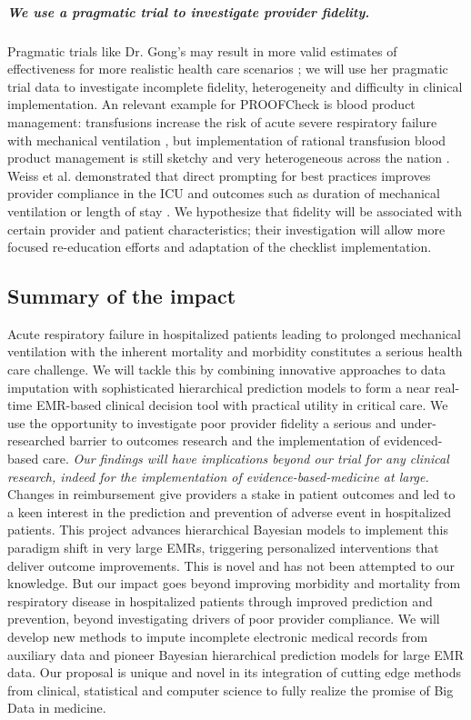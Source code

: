 \documentclass[11pt,notitlepage]{article}
\begin{document}
\subparagraph*{We use a pragmatic trial to investigate provider fidelity.} Pragmatic trials like Dr. Gong's may result in more valid estimates of effectiveness for more realistic health care scenarios \cite{Selby_22824225,Tosh_21842618}; we will use her pragmatic trial data to investigate incomplete fidelity, heterogeneity and difficulty in clinical implementation. An relevant example for PROOFCheck is blood product management: transfusions increase the risk of acute severe respiratory failure with mechanical ventilation \cite{Kenz_24892308}, but implementation of rational transfusion blood product management is still sketchy and very heterogeneous across the nation \cite{Likosky_20488928}. Weiss et al. demonstrated that direct prompting for best practices improves provider compliance in the ICU and outcomes such as duration of mechanical ventilation or length of stay \cite{Weiss_21616996}. We hypothesize that fidelity will be associated with certain provider and patient characteristics; their investigation will allow more focused re-education efforts and adaptation of the checklist implementation. 

\subsection*{Summary of the impact}
Acute respiratory failure in hospitalized patients leading to prolonged mechanical ventilation with the inherent mortality and morbidity constitutes a serious health care challenge. We will tackle this by combining innovative approaches to data imputation with sophisticated hierarchical prediction models to form a near real-time EMR-based clinical decision tool with practical utility in critical care. We use the opportunity to investigate poor provider fidelity a serious and under-researched barrier to outcomes research and the implementation of evidenced-based care. \textit{Our findings will have implications beyond our trial for any clinical research, indeed for the implementation of evidence-based-medicine at large.} Changes in reimbursement give providers a stake in patient outcomes and led to a keen interest in the prediction and prevention of adverse event in hospitalized patients. This project advances hierarchical Bayesian models to implement this paradigm shift in very large EMRs, triggering personalized interventions that deliver outcome improvements. This is novel and has not been attempted to our knowledge. But our impact goes beyond improving morbidity and mortality from respiratory disease in hospitalized patients through improved prediction and prevention, beyond investigating drivers of poor provider compliance. We will develop new methods to impute incomplete electronic medical records from auxiliary data and pioneer Bayesian hierarchical prediction models for large EMR data. Our proposal is unique and novel in its integration of cutting edge methods from clinical, statistical and computer science to fully realize the promise of Big Data in medicine.
\end{document}

